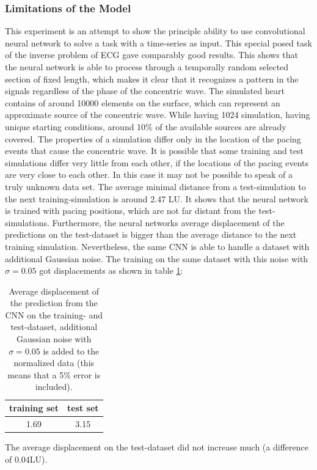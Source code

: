 \subsubsection{Limitations of the Model}
This experiment is an attempt to show the principle ability to use convolutional neural network to solve a task with a time-series as input. This special posed task of the inverse problem of ECG gave comparably good results. This shows that the neural network is able to process through a temporally random selected section of fixed length, which makes it clear that it recognizes a pattern in the signals regardless of the phase of the concentric wave.
The simulated heart contains of around 10000 elements on the surface, which can represent an approximate source of the concentric wave. While having 1024 simulation, having unique starting conditions, around 10\% of the available sources are already covered. 
The properties of a simulation differ only in the location of the pacing events that cause the concentric wave. It is possible that some training and test simulations differ very little from each other, if the locations of the pacing events are very close to each other. In this case it may not be possible to speak of a truly unknown data set. The average minimal distance from a test-simulation to the next training-simulation is around 2.47 LU. It shows that the neural network is trained with pacing positions, which are not far distant from the test-simulations. Furthermore, the neural networks average displacement of the predictions on the test-dataset is bigger than the average distance to the next training simulation.
Nevertheless, the same CNN is able to handle a dataset with additional Gaussian noise. The training on the same dataset with this noise with $\sigma=0.05$ got displacements as shown in table \ref{tab:noise}:

\begin{table}[h]
    \centering
    \begin{tabular}{|c|c|}
    \hline
    training set & test set\\
    \hline
    1.69 & 3.15 \\
    \hline
    \end{tabular}
    \caption{Average displacement of the prediction from the CNN on the training- and test-dataset, additional Gaussian noise with $\sigma=0.05$ is added to the normalized data (this means that a 5\% error is included).}
    \label{tab:noise}
\end{table}

The average displacement on the test-dataset did not increase much (a difference of 0.04LU).

